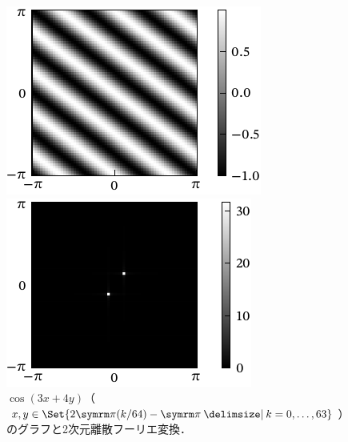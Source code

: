 \documentclass[../../main]{subfiles}
\begin{document}
\begin{figure}[htbp]
  \begin{minipage}{\linewidth/2}
    \centering
    \includegraphics{figures/2dcos.pdf}
    \end{minipage}%
  \begin{minipage}{\linewidth/2}
    \centering
    \includegraphics{figures/2dcos_dft.pdf}
  \end{minipage}
  \caption{\(\cos(3x+4y)\)（\(x,y\in\Set{2\krez(k/64)-\krez\given k=0,\dots,63}\)）のグラフと2次元離散フーリエ変換．}
\end{figure}
\end{document}
